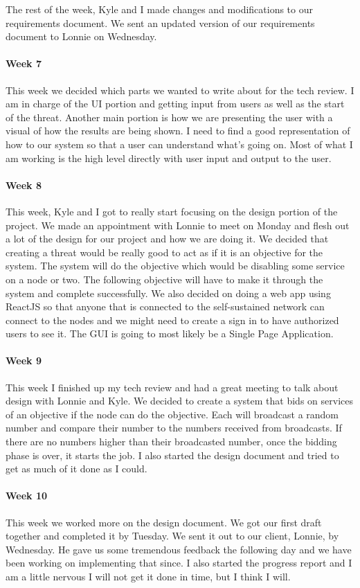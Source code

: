 \documentclass[draftclsnofoot, onecolumn, compsoc, 10pt]{IEEEtran}
\begin{document}
The rest of the week, Kyle and I made changes and modifications to our requirements document. We sent an updated version of our requirements document to Lonnie on Wednesday.
\paragraph{Week 7}
This week we decided which parts we wanted to write about for the tech review. I am in charge of the UI portion and getting input from users as well as the start of the threat. Another main portion is how we are presenting the user with a visual of how the results are being shown. I need to find a good representation of how to our system so that a user can understand what's going on. Most of what I am working is the high level directly with user input and output to the user.  
\paragraph{Week 8}
This week, Kyle and I got to really start focusing on the design portion of the project. We made an appointment with Lonnie to meet on Monday and flesh out a lot of the design for our project and how we are doing it. We decided that creating a threat would be really good to act as if it is an objective for the system. The system will do the objective which would be disabling some service on a node or two. The following objective will have to make it through the system and complete successfully. We also decided on doing a web app using ReactJS so that anyone that is connected to the self-sustained network can connect to the nodes and we might need to create a sign in to have authorized users to see it. The GUI is going to most likely be a Single Page Application.
\paragraph{Week 9}
This week I finished up my tech review and had a great meeting to talk about design with Lonnie and Kyle. We decided to create a system that bids on services of an objective if the node can do the objective. Each will broadcast a random number and compare their number to the numbers received from broadcasts. If there are no numbers higher than their broadcasted number, once the bidding phase is over, it starts the job. I also started the design document and tried to get as much of it done as I could. 
\paragraph{Week 10}
This week we worked more on the design document. We got our first draft together and completed it by Tuesday. We sent it out to our client, Lonnie, by Wednesday. He gave us some tremendous feedback the following day and we have been working on implementing that since. I also started the progress report and I am a little nervous I will not get it done in time, but I think I will. 
\end{document}

